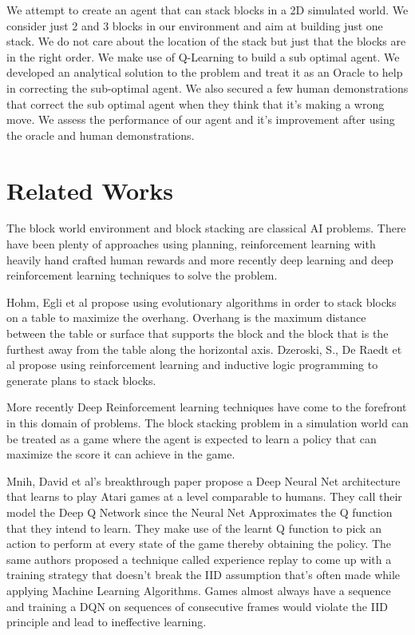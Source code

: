 \documentclass[letterpaper, 12 pt, conference]{ieeeconf}
\begin{document}
We attempt to create an agent that can stack blocks in a 2D simulated world. We consider just 2 and 3 blocks in our environment and aim at building just one stack. We do not care about the location of the stack but just that the blocks are in the right order. We make use of Q-Learning to build a sub optimal agent. We developed  an analytical solution to the problem and treat it as an Oracle to help in correcting the sub-optimal agent. We also secured a few human demonstrations that correct the sub optimal agent when they think that it’s making a wrong move. We assess the performance of our agent and it’s improvement after using the oracle and human demonstrations.


\section{Related Works}


The block world environment and block stacking are classical AI problems. There have been plenty of approaches using planning, reinforcement learning with heavily hand crafted human rewards and more recently deep learning and deep reinforcement learning techniques to solve the problem.

Hohm, Egli et al \cite{hohm2007evolutionary} propose using evolutionary algorithms in order to stack blocks on a table to maximize the overhang. Overhang is the maximum distance between the table or surface that supports the block and the block that is the furthest away from the table along the horizontal axis.  Dzeroski, S., De Raedt et al\cite{dvzeroski2001relational} propose using reinforcement learning and inductive logic programming to generate plans to stack blocks.

More recently Deep Reinforcement learning techniques have come to the forefront in this domain of problems. The block stacking problem in a simulation world can be treated as a game where the agent is expected to learn a policy that can maximize the score it can achieve in the game.

Mnih, David et al's \cite{mnih2013playing} breakthrough paper propose a Deep Neural Net architecture that learns to play Atari games at a level comparable to humans. They call their model the Deep Q Network since the Neural Net Approximates the Q function that they intend to learn. They make use of the learnt Q function to pick an action to perform at every state of the game thereby obtaining the policy. The same authors proposed a technique called experience replay to come up with a training strategy that doesn't break the IID assumption that’s often made while applying Machine Learning Algorithms. Games almost always have a sequence and training a DQN on sequences of consecutive frames would violate the IID principle and lead to ineffective learning. 
\end{document}

